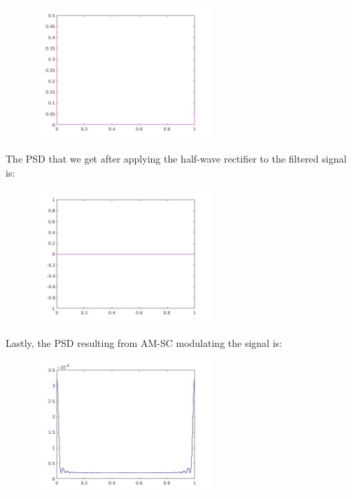 \documentclass[a4paper,11pt]{article}
\begin{document}
\begin{figure}[!hp]
    \begin{center}
    \includegraphics[width=0.6\textwidth]{images/lab3_16.jpg}
    \end{center}
\end{figure}

\newpage

The PSD that we get after applying the half-wave rectifier to the filtered signal is:

\begin{figure}[!hp]
    \begin{center}
    \includegraphics[width=0.6\textwidth]{images/lab3_18.jpg}
    \end{center}
\end{figure}

Lastly, the PSD resulting from AM-SC modulating the signal is:

\begin{figure}[!hp]
    \begin{center}
    \includegraphics[width=0.6\textwidth]{images/lab3_20.jpg}
    \end{center}
\end{figure}
\end{document}
